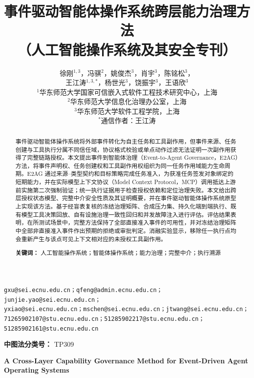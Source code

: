 \documentclass[UTF8,zihao=5,fontset=none]{ctexart}
\title{\bfseries\zihao{-2} 事件驱动智能体操作系统跨层能力治理方法\\[0.25em]
{\zihao{-3}（人工智能操作系统及其安全专刊）}}
\author{徐刚$^{1,3}$，冯骐$^{2}$，姚俊杰$^{3}$，肖宇$^{3}$，陈铭松$^{3}$，\\
王江涛$^{1,3,*}$，杨世光$^{3}$，饶振宇$^{3}$，王语欣$^{3}$\\[0.45em]
{\small $^{1}$华东师范大学国家可信嵌入式软件工程技术研究中心，上海}\\
{\small $^{2}$华东师范大学信息化治理办公室，上海}\\
{\small $^{3}$华东师范大学软件工程学院，上海}\\[0.25em]
{\small $^{*}$通信作者：王江涛}}
\date{}
\begin{document}
\maketitle

\begin{center}\footnotesize
\texttt{gxu@sei.ecnu.edu.cn；qfeng@admin.ecnu.edu.cn；junjie.yao@sei.ecnu.edu.cn；}\\[-0.1em]
\texttt{yxiao@sei.ecnu.edu.cn；mschen@sei.ecnu.edu.cn；jtwang@sei.ecnu.edu.cn；}\\[-0.1em]
\texttt{71265902107@stu.ecnu.edu.cn；51285902217@stu.ecnu.edu.cn；51285902161@stu.ecnu.edu.cn}
\end{center}

\begin{abstract}
事件驱动智能体操作系统将外部事件转化为自主任务和工具副作用，但事件来源、任务创建与工具执行分属不同信任域，协议格式校验或单点动作过滤无法证明一次副作用获得了完整链路授权。本文提出事件到智能体治理（Event-to-Agent Governance，E2AG）方法，将事件声明权、任务创建权和工具副作用权组织为同一任务作用域能力生命周期。E2AG 通过来源--类型契约和目标策略完成任务准入，为获准任务签发对象绑定的短期能力，并在实际模型上下文协议（Model Context Protocol，MCP）调用抵达上游前实施第二次强制验证；统一执行证据用于检查授权依赖和定位治理失败。本文给出跨层授权状态模型、完整中介安全性质及其证明概要，并在事件驱动智能体操作系统原型上实现该方法。基于经盲表复核的冻结治理矩阵、合成压力集、持久化端到端执行、既有模型工具决策回放、自有设施治理一致性回归和并发故障注入进行评估。评估结果表明，在所测试场景中，完整方法保持了全部直接准入事件的可用性，并对冻结治理矩阵中全部非直接准入事件作出预期的拒绝或审批判定。消融实验显示，移除任一执行点均会重新产生与该点可见上下文相对应的未授权工具副作用。

\noindent\textbf{关键词：} 人工智能操作系统；智能体操作系统；能力治理；完整中介；执行溯源
\end{abstract}

\noindent\textbf{中图法分类号：} TP309

\begin{center}
{\bfseries\large A Cross-Layer Capability Governance Method for Event-Driven Agent Operating Systems}
\end{center}
\end{document}
